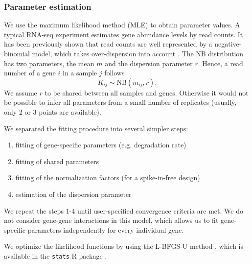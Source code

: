 \subsubsection*{Parameter estimation}
We use the maximum likelihood method (MLE) to obtain parameter values.
A typical RNA-seq experiment estimates gene abundance levels by read counts.
It has been previously shown that read counts are well represented by a negative-binomial model,
which takes over-dispersion into account 
\citep{robinson2007moderated}.
The NB distribution has two parameters, the mean $m$ and the dispersion parameter 
$r$.
Hence,  a read number of a gene $i$ in a sample $j$ follows
\begin{equation}
 K_{ij} \sim \text{NB}(m_{ij}, r).
\end{equation}
We assume $r$ to be shared between all
samples and genes. Otherwise it would not be possible to infer all parameters 
from a small number of replicates (usually, only 2 or 3 points are available).

We separated the fitting procedure into several simpler steps:
\begin{enumerate}
 \item fitting of gene-specific parameters (e.g. degradation rate)
 \item fitting of shared parameters  
 \item fitting of the normalization factors (for a spike-in-free design)
 \item estimation of the dispersion parameter 
\end{enumerate}
We repeat the steps 1-4 until user-specified convergence criteria are met.
We do not consider gene-gene interactions in this model, which 
allows us to  fit gene-specific parameters independently for every individual gene. 

We optimize the likelihood functions by using the {L-BFGS-U} method \citep{byrd1995limited}, which is
available in the \verb|stats| R package \citep{rlang}.